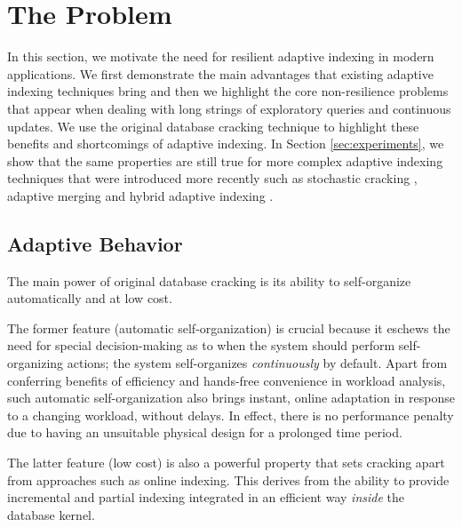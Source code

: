
\section{The Problem}
\label{sec:problem}

In this section, we motivate the need for resilient adaptive indexing in modern applications.
We first demonstrate the main advantages that existing adaptive indexing
techniques bring and then we highlight the core non-resilience problems that appear
when dealing with long strings of exploratory queries and continuous updates.
We use the original database cracking technique to highlight these benefits
and shortcomings of adaptive indexing. In Section \ref{sec:experiments},
we show that the same properties are still true for more complex adaptive indexing techniques
that were introduced more recently such as 
stochastic cracking \cite{StochasticCracking}, adaptive merging \cite{GK10b}  
and hybrid adaptive indexing \cite{AdaptiveIndexing}.


\subsection{Adaptive Behavior}
The main power of original database cracking is its ability to self-organize
automatically and at low cost.

The former feature (automatic self-organization) is crucial because it eschews the need for special decision-making as to when
the system should perform self-organizing actions;
the system self-organizes \emph{continuously} by default.
Apart from conferring benefits of efficiency and hands-free convenience in workload analysis,
such automatic self-organization also brings instant, online adaptation in response to a changing workload,
without delays.
In effect, there is no performance penalty due to having an unsuitable physical design
for a prolonged time period.

The latter feature (low cost) is also a powerful property that sets cracking apart
from approaches such as online indexing. This derives
from the ability to provide incremental and partial indexing integrated in an efficient way
\emph{inside} the database kernel.

